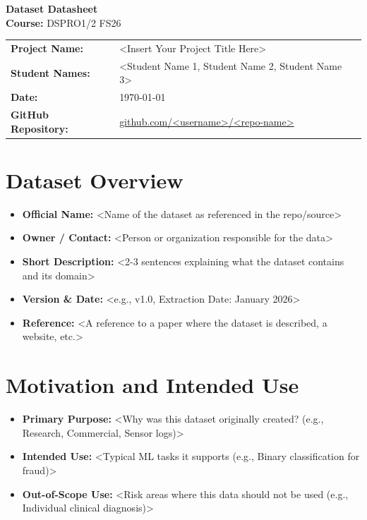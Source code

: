 \documentclass[11pt, a4paper]{article}
\begin{document}
\begin{center}
    {\huge \bfseries \color{primaryBlue} Dataset Datasheet} \\[0.2cm]
    {\large \textbf{Course:} DSPRO1/2 FS26} \\[0.1cm]
\end{center}

\vspace{0.4cm}

\begin{studentbox}
    \begin{tabularx}{\textwidth}{l X}
        \textbf{Project Name:} & <Insert Your Project Title Here> \\
        \textbf{Student Names:} & <Student Name 1, Student Name 2, Student Name 3> \\
        \textbf{Date:} & \today \\
        \textbf{GitHub Repository:} & \url{github.com/<username>/<repo-name>} \\
    \end{tabularx}
\end{studentbox}

\vspace{0.5cm}

\section{Dataset Overview}
\begin{itemize}
    \item \textbf{Official Name:} <Name of the dataset as referenced in the repo/source>
    \item \textbf{Owner / Contact:} <Person or organization responsible for the data>
    \item \textbf{Short Description:} <2-3 sentences explaining what the dataset contains and its domain>
    \item \textbf{Version \& Date:} <e.g., v1.0, Extraction Date: January 2026>
    \item \textbf{Reference:} <A reference to a paper where the dataset is described, a website, etc.>
\end{itemize}

\section{Motivation and Intended Use}
\begin{itemize}
    \item \textbf{Primary Purpose:} <Why was this dataset originally created? (e.g., Research, Commercial, Sensor logs)>
    \item \textbf{Intended Use:} <Typical ML tasks it supports (e.g., Binary classification for fraud)>
    \item \textbf{Out-of-Scope Use:} <Risk areas where this data should not be used (e.g., Individual clinical diagnosis)>
\end{itemize}
\end{document}
